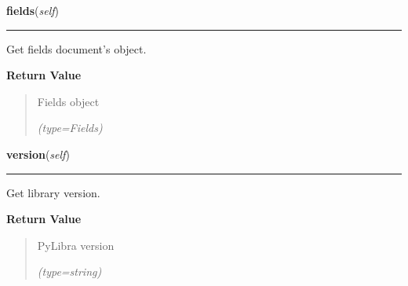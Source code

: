     \vspace{0.5ex}

\hspace{.8\funcindent}\begin{boxedminipage}{\funcwidth}

    \raggedright \textbf{fields}(\textit{self})

    \vspace{-1.5ex}

    \rule{\textwidth}{0.5\fboxrule}
\setlength{\parskip}{2ex}
    Get fields document's object.

\setlength{\parskip}{1ex}
      \textbf{Return Value}
    \vspace{-1ex}

      \begin{quote}
      Fields object

      {\it (type=Fields)}

      \end{quote}

    \end{boxedminipage}

    \label{src:pylibratm:Template:version}

    \vspace{0.5ex}

\hspace{.8\funcindent}\begin{boxedminipage}{\funcwidth}

    \raggedright \textbf{version}(\textit{self})

    \vspace{-1.5ex}

    \rule{\textwidth}{0.5\fboxrule}
\setlength{\parskip}{2ex}
    Get library version.

\setlength{\parskip}{1ex}
      \textbf{Return Value}
    \vspace{-1ex}

      \begin{quote}
      PyLibra version

      {\it (type=string)}

      \end{quote}

    \end{boxedminipage}

    \label{src:pylibratm:Template:close_document}

